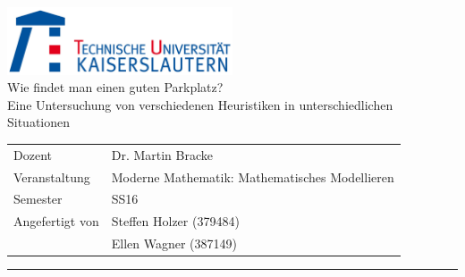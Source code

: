 \begin{titlepage}
{\centering
\includegraphics[width=0.5\textwidth]{pics/tu-logo}\\
}
{\huge\centering
Wie findet man einen guten Parkplatz?\\
\noindent\large
Eine Untersuchung von verschiedenen Heuristiken in unterschiedlichen Situationen\\[1cm]
}
\begin{tabular}{ll}
Dozent&Dr. Martin Bracke\\
Veranstaltung&Moderne Mathematik: Mathematisches Modellieren\\
Semester& SS16\\
Angefertigt von&Steffen Holzer (379484)\\
&Ellen Wagner (387149)
\end{tabular}
\hrule
\tableofcontents
\pagestyle{empty}
\end{titlepage}